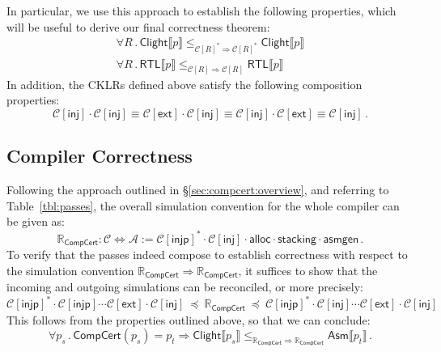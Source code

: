 \documentclass[acmsmall,timestamp,review,anonymous]{acmart}
\newcommand{\kw}[1]{\ensuremath{ \mathsf{#1} }}
\begin{document}
In particular,
we use this approach to establish the following properties,
which will be useful to derive our final correctness theorem:
\begin{gather}
    \forall R \,.\,
      \kw{Clight} \llbracket p \rrbracket
        \le_{\mathcal{C}[R]^* \Rightarrow \mathcal{C}[R]^*}
      \kw{Clight} \llbracket p \rrbracket
      \label{eqn:clight}
      \\
    \forall R \,.\,
      \kw{RTL} \llbracket p \rrbracket
        \le_{\mathcal{C}[R] \Rightarrow \mathcal{C}[R]}
      \kw{RTL} \llbracket p \rrbracket
      \label{eqn:rtl}
\end{gather}
In addition,
the CKLRs defined above satisfy the following
composition properties:
\[
  \mathcal{C}[\kw{inj}] \cdot \mathcal{C}[\kw{inj}] \equiv
  \mathcal{C}[\kw{ext}] \cdot \mathcal{C}[\kw{inj}] \equiv
  \mathcal{C}[\kw{inj}] \cdot \mathcal{C}[\kw{ext}] \equiv
  \mathcal{C}[\kw{inj}] \,.
\]



\subsection{Compiler Correctness} %

Following the approach outlined in \S\ref{sec:compcert:overview},
and referring to Table~\ref{tbl:passes},
the overall simulation convention for the whole compiler
can be given as:
\[
  \mathbb{R}_\kw{CompCert} : \mathcal{C} \Leftrightarrow \mathcal{A} :=
    \mathcal{C}[\kw{injp}]^* \cdot
    \mathcal{C}[\kw{inj}] \cdot
    \kw{alloc} \cdot
    \kw{stacking} \cdot
    \kw{asmgen} \,.
\]
To verify that the passes indeed compose to
establish correctness with respect to the simulation convention
$\mathbb{R}_\kw{CompCert} \Rightarrow \mathbb{R}_\kw{CompCert}$,
it suffices to show that
the incoming and outgoing simulations can be reconciled,
or more precisely:
\[
    \mathcal{C}[\kw{injp}]^* \cdot
    \mathcal{C}[\kw{injp}] \cdots
    \mathcal{C}[\kw{ext}] \cdot
    \mathcal{C}[\kw{inj}]
    \: \preceq \:
    \mathbb{R}_\kw{CompCert}
    \: \preceq \:
    \mathcal{C}[\kw{injp}]^* \cdot
    \mathcal{C}[\kw{inj}] \cdots
    \mathcal{C}[\kw{ext}] \cdot
    \mathcal{C}[\kw{inj}] 
\]
This follows from the properties outlined above,
so that we can conclude:
\[
    \forall p_s \,.\,
      \kw{CompCert}(p_s) = p_t \Rightarrow
      \kw{Clight} \llbracket p_s \rrbracket
      \le_{\mathbb{R}_\kw{CompCert} \Rightarrow \mathbb{R}_\kw{CompCert}}
      \kw{Asm} \llbracket p_t \rrbracket \,.
\]
\end{document}
